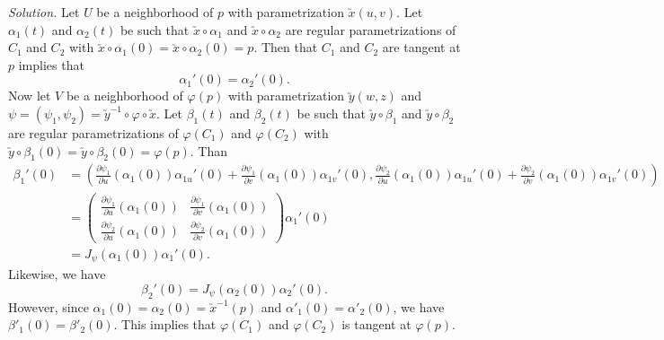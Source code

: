 \documentclass[12pt]{article}
\begin{document}
\textit{Solution.} Let $U$ be a neighborhood of $p$ with parametrization $\utilde{x}(u,v)$. Let $\alpha_1(t)$ and $\alpha_2(t)$ be such that $\utilde{x}\circ \alpha_1$ and $\utilde{x}\circ \alpha_2$ are regular parametrizations of $C_1$ and $C_2$ with $\utilde{x}\circ \alpha_1(0) = \utilde{x}\circ \alpha_2(0)=p$. Then that $C_1$ and $C_2$ are tangent at $p$ implies that \begin{equation*}
    \alpha_1'(0) = \alpha_2'(0).
\end{equation*}
Now let $V$ be a neighborhood of $\varphi(p)$ with parametrization $\utilde{y}(w,z)$ and $\psi =(\psi_1,\psi_2)= \utilde{y}^{-1}\circ \varphi\circ \utilde{x}$. Let $\beta_1(t)$ and $\beta_2(t)$ be such that $\utilde{y}\circ \beta_1$ and $\utilde{y}\circ \beta_2$ are regular parametrizations of $\varphi(C_1)$ and $\varphi(C_2)$ with $\utilde{y}\circ \beta_1(0) = \utilde{y}\circ \beta_2(0)=\varphi(p)$. Than
\begin{align*}
    \beta_1'(0) &= \left(\frac{\partial \psi_1}{\partial u}(\alpha_{1}(0))\alpha_{1u}'(0)+\frac{\partial \psi_1}{\partial v}(\alpha_{1}(0))\alpha_{1v}'(0),\frac{\partial \psi_2}{\partial u}(\alpha_{1}(0))\alpha_{1u}'(0)+\frac{\partial \psi_2}{\partial v}(\alpha_{1}(0))\alpha_{1v}'(0)\right)\\
    &=\begin{pmatrix}
    \frac{\partial \psi_1}{\partial u}(\alpha_{1}(0))&\frac{\partial \psi_1}{\partial v}(\alpha_{1}(0))\\
    \frac{\partial \psi_2}{\partial u}(\alpha_{1}(0))&\frac{\partial \psi_2}{\partial v}(\alpha_{1}(0))
    \end{pmatrix}\alpha_1'(0)\\
    &= J_\psi(\alpha_1(0))\alpha_1'(0).
\end{align*}
Likewise, we have \begin{equation*}
    \beta_2'(0) = J_\psi(\alpha_2(0))\alpha_2'(0).
\end{equation*}
However, since $\alpha_1(0)=\alpha_2(0) = \utilde{x}^{-1}(p)$ and $\alpha'_1(0)=\alpha'_2(0)$, we have $\beta'_1(0)=\beta'_2(0)$. This implies that $\varphi(C_1)$ and $\varphi(C_2)$ is tangent at $\varphi(p)$.
\end{document}
